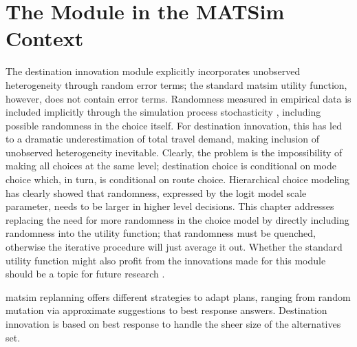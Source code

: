 \section{The Module in the MATSim Context}
The destination innovation module explicitly incorporates unobserved heterogeneity through random error terms; 
the standard \gls{matsim} utility function, however, does not contain error terms. 
Randomness measured in empirical data is included implicitly through the simulation process stochasticity , including possible randomness in the choice itself. 
For destination innovation, this has led to a dramatic underestimation of total travel demand, making inclusion of unobserved heterogeneity inevitable.
%
Clearly, the problem is the impossibility of making all choices at the same level; destination choice is conditional on mode choice which, in turn, is conditional on route choice. Hierarchical choice modeling has clearly showed that randomness, expressed by the logit model scale parameter, needs to be larger in higher level decisions.  This chapter addresses replacing the need for more randomness in the choice model by directly including randomness into the utility function; that randomness must be quenched, otherwise the iterative procedure will just average it out.
%
Whether the standard utility function might also profit from the innovations made for this module should be a topic for future research .

\gls{matsim} replanning offers different strategies to adapt plans, ranging from random mutation via approximate suggestions to best response answers. 
Destination innovation is based on best response to handle the sheer size of the alternatives set. 

